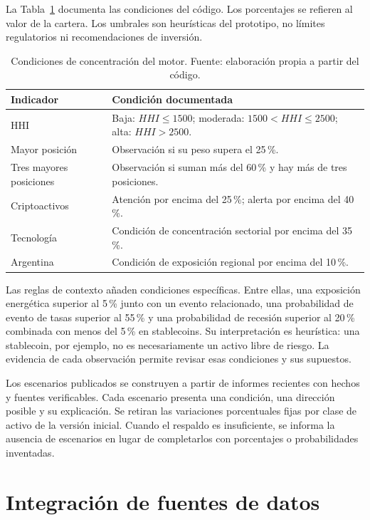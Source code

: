 La Tabla~\ref{tab:umbrales} documenta las condiciones del código. Los porcentajes se refieren al valor de la cartera. Los umbrales son heurísticas del prototipo, no límites regulatorios ni recomendaciones de inversión.
\begin{table}[ht]
\centering\small
\caption{Condiciones de concentración del motor. Fuente: elaboración propia a partir del código.}\label{tab:umbrales}
\begin{tabular}{p{4cm}p{8.2cm}}\hline
\textbf{Indicador} & \textbf{Condición documentada}\\\hline
HHI & Baja: $HHI\leq1500$; moderada: $1500<HHI\leq2500$; alta: $HHI>2500$.\\
Mayor posición & Observación si su peso supera el 25\,\%.\\
Tres mayores posiciones & Observación si suman más del 60\,\% y hay más de tres posiciones.\\
Criptoactivos & Atención por encima del 25\,\%; alerta por encima del 40\,\%.\\
Tecnología & Condición de concentración sectorial por encima del 35\,\%.\\
Argentina & Condición de exposición regional por encima del 10\,\%.\\\hline
\end{tabular}
\end{table}

Las reglas de contexto añaden condiciones específicas. Entre ellas, una exposición energética superior al 5\,\% junto con un evento relacionado, una probabilidad de evento de tasas superior al 55\,\% y una probabilidad de recesión superior al 20\,\% combinada con menos del 5\,\% en stablecoins. Su interpretación es heurística: una stablecoin, por ejemplo, no es necesariamente un activo libre de riesgo. La evidencia de cada observación permite revisar esas condiciones y sus supuestos.

Los escenarios publicados se construyen a partir de informes recientes con hechos y fuentes verificables. Cada escenario presenta una condición, una dirección posible y su explicación. Se retiran las variaciones porcentuales fijas por clase de activo de la versión inicial. Cuando el respaldo es insuficiente, se informa la ausencia de escenarios en lugar de completarlos con porcentajes o probabilidades inventadas.

\section{Integración de fuentes de datos}\label{sec:integracion-fuentes}

